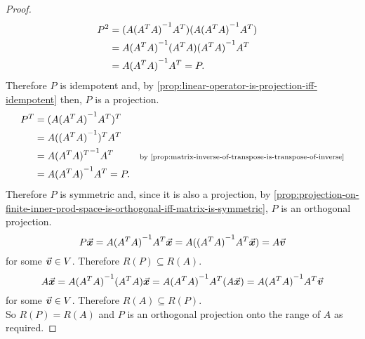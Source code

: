\documentclass[../MathsNotesBase.tex]{subfiles}
\begin{document}
{	\bigskip
	\begin{proof}
		\[\begin{aligned}
			P^2 &= (A {(A^T A)}^{-1} A^T) (A {(A^T A)}^{-1} A^T) \\
			&= A {(A^T A)}^{-1} (A^T A) {(A^T A)}^{-1} A^T &\text{\scriptsize{}} \\
			&= A {(A^T A)}^{-1} A^T = P.
		\end{aligned}\]
		Therefore $P$ is idempotent and, by \autoref{prop:linear-operator-is-projection-iff-idempotent} then, $P$ is a projection.\\
		
		\[\begin{aligned}
			P^T &= (A \inv{(A^T A)} A^T)^T \\
			&= A (\inv{(A^T A)})^T A^T &\sidecomment{} \\
			&= A \inv{(A^T A)^T} A^T &\sidecomment{by \autoref{prop:matrix-inverse-of-transpose-is-transpose-of-inverse}} \\
			&= A \inv{(A^T A)} A^T = P.
		\end{aligned}\]
		Therefore $P$ is symmetric and, since it is also a projection, by \autoref{prop:projection-on-finite-inner-prod-space-is-orthogonal-iff-matrix-is-symmetric}, $P$ is an orthogonal projection.\\
		
		\[ P\vec{\bm{x}} =  A {(A^T A)}^{-1} A^T \vec{\bm{x}} = A ({(A^T A)}^{-1} A^T \vec{\bm{x}}) = A\vec{\bm{v}} \]
		for some ${ \vec{\bm{v}} \in V }$. Therefore ${ R(P) \subseteq R(A) }$.\\
		
		\[ A\vec{\bm{x}} = A {(A^T A)}^{-1} (A^T A) \vec{\bm{x}} = A {(A^T A)}^{-1} A^T (A\vec{\bm{x}}) = A {(A^T A)}^{-1} A^T \vec{\bm{v}} \]
		for some ${ \vec{\bm{v}} \in V }$. Therefore ${ R(A) \subseteq R(P) }$.\\
		
		So ${ R(P) = R(A) }$ and $P$ is an orthogonal projection onto the range of $A$ as required.
	\end{proof}

}
\end{document}
